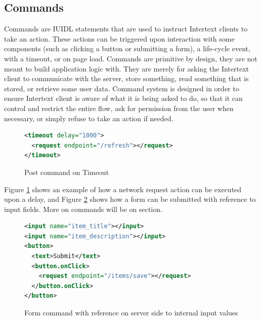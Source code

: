 \subsection{Commands}

Commands are IUIDL statements that are used to instruct Intertext clients to take an action. These actions can be triggered upon interaction with some components (such as clicking a button or submitting a form), a life-cycle event, with a timeout, or on page load. Commands are primitive by design, they are not meant to build application logic with. They are merely for asking the Intertext client to communicate with the server, store something, read something that is stored, or retrieve some user data. Command system is designed in order to ensure Intertext client is aware of what it is being asked to do, so that it can control and restrict the entire flow, ask for permission from the user when necessary, or simply refuse to take an action if needed. 

\begin{figure}[htb]
\begin{minipage}{\linewidth}
\begin{lstlisting}[language=xml]
<timeout delay="1000">
  <request endpoint="/refresh"></request>
</timeout>
\end{lstlisting}
\end{minipage}
\caption{Post command on Timeout}%
\label{fig:ex_cmd_post_timeout}%
\end{figure}

Figure \ref{fig:ex_cmd_post_timeout} shows an example of how a network request action can be executed upon a delay, and Figure \ref{fig:ex_cmd_form} shows how a form can be submitted with reference to input fields. More on commands will be on  section.

\begin{figure}[htb]
\begin{minipage}{\linewidth}
\begin{lstlisting}[language=xml]
<input name="item_title"></input>
<input name="item_description"></input>
<button>
  <text>Submit</text>
  <button.onClick>
    <request endpoint="/items/save"></request>
  </button.onClick>
</button>
\end{lstlisting}
\end{minipage}
\caption{Form command with reference on server side to internal input values}%
\label{fig:ex_cmd_form}%
\end{figure}

